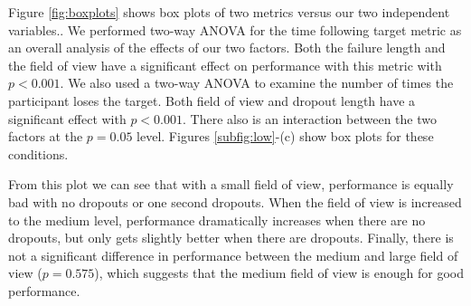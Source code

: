 \documentclass{acmsiggraph}                     %
\begin{document}


Figure \ref{fig:boxplots} shows box plots of two metrics versus our two independent variables..
We performed two-way {ANOVA} for the time following target metric as an overall analysis of the effects of our two factors.
Both the failure length and the field of view have a significant effect on performance with this metric with $p<0.001$.
We also used a two-way {ANOVA} to examine the number of times the participant loses the target.
Both field of view and dropout length have a significant effect with $p<0.001$.  There also is an interaction between the two factors at the $p=0.05$ level.  Figures \ref{subfig:low}-(c) show box plots for these conditions.  

From this plot we can see that with a small field of view, performance is equally bad with no dropouts or one second dropouts.  
When the field of view is increased to the medium level, performance dramatically increases when there are no dropouts, but only gets slightly better when there are dropouts.  Finally, there is not a significant difference in performance between the medium and large field of view ($p=0.575$), which suggests that the medium field of view is enough for good performance.


\end{document}
